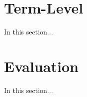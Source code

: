 \regexIsCapturing

\section{Term-Level}
\label{sec:term-level}

In this section...

\section{Evaluation}

In this section...
